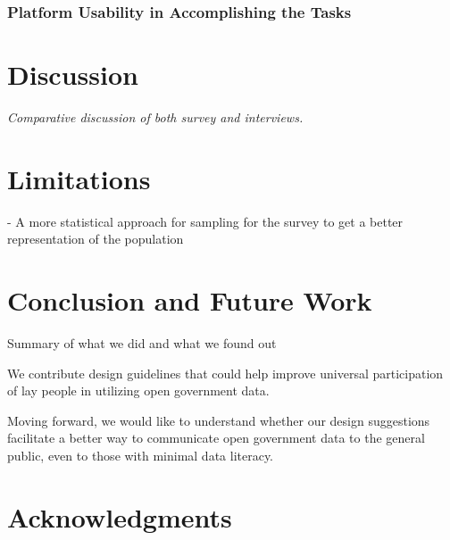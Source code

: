 \documentclass{sigchi}
\begin{document}

\subsubsection{Platform Usability in Accomplishing the Tasks}

\section{Discussion}
\textit{Comparative discussion of both survey and interviews.}

\begin{comment}
From model paper:
We address our first two research questions by summarizing our results. We then discuss insights to broader policy implications to improve the feasibility of online grocery delivery services within low-income and transportation-scarce regions. We conclude by contributing design implications for how online-grocery service interfaces can address participant barriers to using such services. To answer our fnal research question, we leverage past HCI literature to support our implications and further extend the literature.
\end{comment}


\section{Limitations}
- A more statistical approach for sampling for the survey to get a better representation of the population

\section{Conclusion and Future Work}
Summary of what we did and what we found out

We contribute design guidelines that could help improve universal participation of lay people in utilizing open government data.

Moving forward, we would like to understand whether our design suggestions facilitate a better way to communicate open government data to the general public, even to those with minimal data literacy. 

\section{Acknowledgments}
\end{document}

